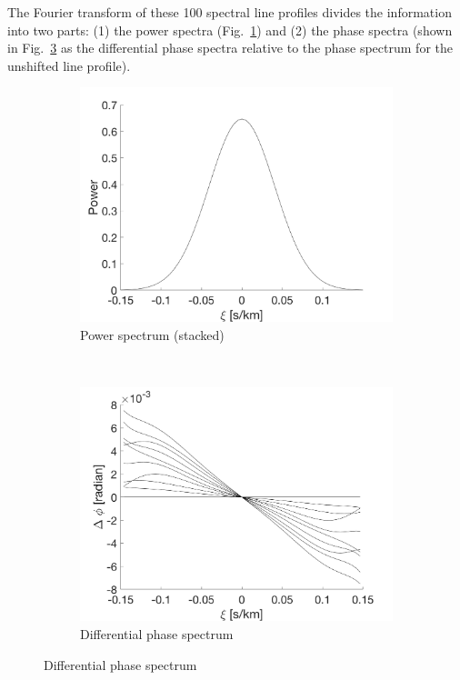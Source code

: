 The Fourier transform of these 100 spectral line profiles divides the information into two parts: 
(1) the power spectra (Fig.~\ref{fig:power_spectrum}) and (2) the phase spectra (shown in Fig.~\ref{fig:dps}
as the differential phase spectra relative to the phase spectrum for the unshifted line profile). 

\begin{figure}[tbp]	
    \begin{subfigure}[b]{0.49\textwidth}
        \includegraphics[width=\textwidth]{./Figures/Methods/2-FT_power.png}
        \caption{Power spectrum (stacked)}
        \label{fig:power_spectrum}
    \end{subfigure}
	~
    \begin{subfigure}[b]{0.49\textwidth}
        \includegraphics[width=\textwidth]{./Figures/Methods/4-Relative_phase_angle.png}
        \caption{Differential phase spectrum}
        \label{fig:dps}
    \end{subfigure}	
    

\end{figure}

